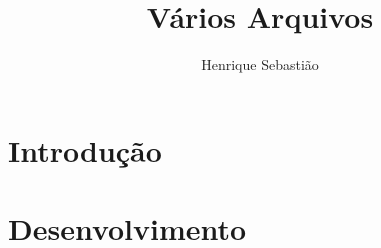 \documentclass{article}
\begin{document}
\title{\textbf{\Huge Vários Arquivos}}
\author{Henrique Sebastião}
\maketitle

\newpage

\section{Introdução}


\section{Desenvolvimento}

\end{document}
